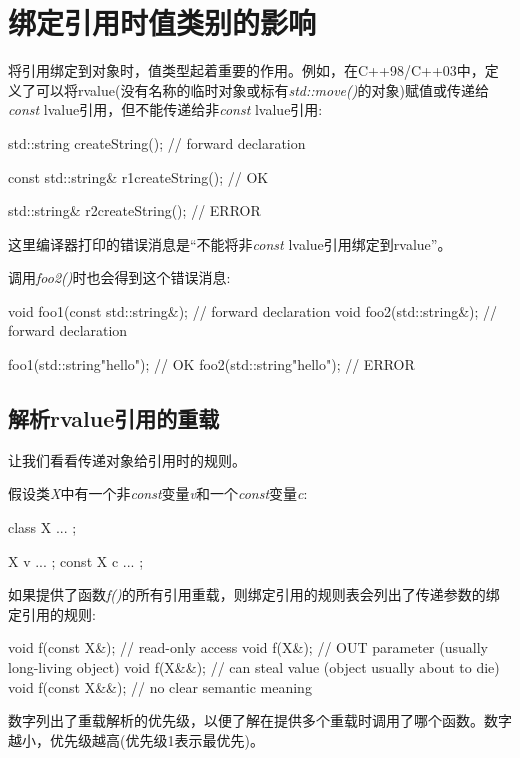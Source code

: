 \section{绑定引用时值类别的影响}
将引用绑定到对象时，值类型起着重要的作用。例如，在C++98/C++03中，定义了可以将rvalue(没有名称的临时对象或标有\textit{std::move()}的对象)赋值或传递给\textit{const} lvalue引用，但不能传递给非\textit{const} lvalue引用:

\begin{cppcode}
std::string createString(); // forward declaration

const std::string& r1{createString()}; // OK

std::string& r2{createString()}; // ERROR
\end{cppcode}

这里编译器打印的错误消息是“不能将非\textit{const} lvalue引用绑定到rvalue”。

调用\textit{foo2()}时也会得到这个错误消息:

\begin{cppcode}
void foo1(const std::string&); // forward declaration
void foo2(std::string&); // forward declaration

foo1(std::string{"hello"}); // OK
foo2(std::string{"hello"}); // ERROR
\end{cppcode}

\subsection{解析rvalue引用的重载}

让我们看看传递对象给引用时的规则。

假设类\textit{X}中有一个非\textit{const}变量\textit{v}和一个\textit{const}变量\textit{c}:

\begin{cppcode}
class X {
	...
};

X v{ ... };
const X c{ ... };
\end{cppcode}

如果提供了函数\textit{f()}的所有引用重载，则绑定引用的规则表会列出了传递参数的绑定引用的规则:

\begin{cppcode}
void f(const X&); // read-only access
void f(X&); // OUT parameter (usually long-living object)
void f(X&&); // can steal value (object usually about to die)
void f(const X&&); // no clear semantic meaning
\end{cppcode}

数字列出了重载解析的优先级，以便了解在提供多个重载时调用了哪个函数。数字越小，优先级越高(优先级1表示最优先)。

